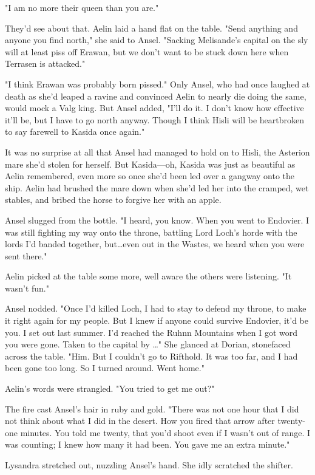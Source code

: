 "I am no more their queen than you are."

They'd see about that.
Aelin laid a hand flat on the table.
"Send anything and anyone you find north," she said to Ansel.
"Sacking Melisande's capital on the sly will at least piss off Erawan, but we don't want to be stuck down here when Terrasen is attacked."

"I think Erawan was probably born pissed."
Only Ansel, who had once laughed at death as she'd leaped a ravine and convinced Aelin to nearly die doing the same, would mock a Valg king.
But Ansel added, "I'll do it.
I don't know how effective it'll be, but I have to go north anyway.
Though I think Hisli will be heartbroken to say farewell to Kasida once again."

It was no surprise at all that Ansel had managed to hold on to Hisli, the Asterion mare she'd stolen for herself.
But Kasida---oh, Kasida was just as beautiful as Aelin remembered, even more so once she'd been led over a gangway onto the ship.
Aelin had brushed the mare down when she'd led her into the cramped, wet stables, and bribed the horse to forgive her with an apple.

Ansel slugged from the bottle.
"I heard, you know.
When you went to Endovier.
I was still fighting my way onto the throne, battling Lord Loch's horde with the lords I'd banded together, but\ldots even out in the Wastes, we heard when you were sent there."

Aelin picked at the table some more, well aware the others were listening.
"It wasn't fun."

Ansel nodded.
"Once I'd killed Loch, I had to stay to defend my throne, to make it right again for my people.
But I knew if anyone could survive Endovier, it'd be you.
I set out last summer.
I'd reached the Ruhnn Mountains when I got word you were gone.
Taken to the capital by \ldots" She glanced at Dorian, stonefaced across the table.
"Him.
But I couldn't go to Rifthold.
It was too far, and I had been gone too long.
So I turned around.
Went home."

Aelin's words were strangled.
"You tried to get me out?"

The fire cast Ansel's hair in ruby and gold.
"There was not one hour that I did not think about what I did in the desert.
How you fired that arrow after twenty-one minutes.
You told me twenty, that you'd shoot even if I wasn't out of range.
I was counting; I knew how many it had been.
You gave me an extra minute."

Lysandra stretched out, nuzzling Ansel's hand.
She idly scratched the shifter.

